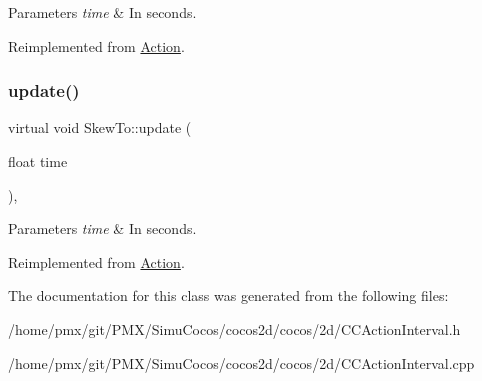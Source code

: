 \begin{DoxyParams}{Parameters}
{\em time} & In seconds. \\
\hline
\end{DoxyParams}


Reimplemented from \hyperlink{classAction_a937e646e63915e33ad05ba149bfcf239}{Action}.

\mbox{\label{classSkewTo_a85d6a656272bcb08a97a7d98d0fa4f06}} 
\subsubsection{\texorpdfstring{update()}{update()}\hspace{0.1cm}{\footnotesize\ttfamily [2/2]}}
{\footnotesize\ttfamily virtual void Skew\+To\+::update (\begin{DoxyParamCaption}\item[{float}]{time }\end{DoxyParamCaption})\hspace{0.3cm}{\ttfamily [override]}, {\ttfamily [virtual]}}


\begin{DoxyParams}{Parameters}
{\em time} & In seconds. \\
\hline
\end{DoxyParams}


Reimplemented from \hyperlink{classAction_a937e646e63915e33ad05ba149bfcf239}{Action}.



The documentation for this class was generated from the following files\+:\begin{DoxyCompactItemize}
\item 
/home/pmx/git/\+P\+M\+X/\+Simu\+Cocos/cocos2d/cocos/2d/C\+C\+Action\+Interval.\+h\item 
/home/pmx/git/\+P\+M\+X/\+Simu\+Cocos/cocos2d/cocos/2d/C\+C\+Action\+Interval.\+cpp\end{DoxyCompactItemize}
